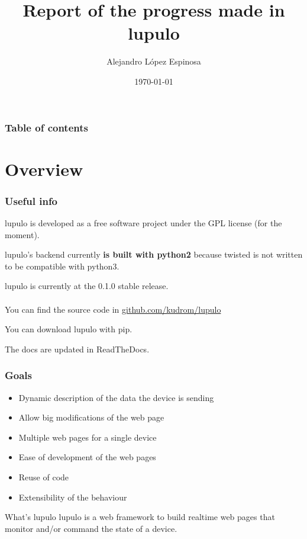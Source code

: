 \documentclass{beamer}
\title[Overview of lupulo]{Report of the progress made in \textbf{lupulo}}
\author{Alejandro López Espinosa}
\institute[VIVES university]
{
    VIVES University
    \medskip
}
\date{\today}
\begin{document}
    \begin{frame}
    \titlepage
    \end{frame}

    \begin{frame}
        \frametitle{Table of contents}
        \tableofcontents
    \end{frame}

    \section{Overview}
    \begin{frame}
        \frametitle{Useful info}
        lupulo is developed as a free software project under the GPL
        license (for the moment).

        lupulo's backend currently \textbf{is built with python2} because
        twisted is not written to be compatible with python3.

        lupulo is currently at the 0.1.0 stable release.
        \\~\\

        You can find the source code in 
        \textcolor{orange}{\href{http://github.com/kudrom/lupulo}{github.com/kudrom/lupulo}}

        You can download lupulo with pip.

        The docs are updated in ReadTheDocs.
    \end{frame}

    \begin{frame}
        \frametitle{Goals}
        \begin{itemize}
            \item Dynamic description of the data the device is sending
            \item Allow big modifications of the web page
            \item Multiple web pages for a single device
            \item Ease of development of the web pages
            \item Reuse of code
            \item Extensibility of the behaviour
        \end{itemize}
        \vspace{1cm}

        \begin{block}{What's lupulo}
            lupulo is a web framework to build realtime web pages that monitor
            and/or command the state of a device.
        \end{block}
    \end{frame}
\end{document}
